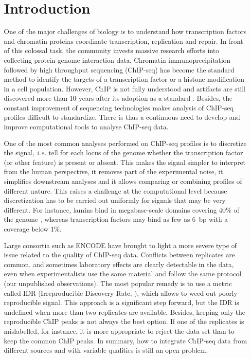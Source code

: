 \documentclass{bioinfo}
\begin{document}
\section{Introduction}
One of the major challenges of biology is to understand how
transcription factors and chromatin proteins coordinate transcription,
replication and repair. In front of this colossal task, the community
invests massive research efforts into collecting protein-genome
interaction data. Chromatin immunoprecipitation followed by high
throughput sequencing (ChIP-seq) has become the standard method to
identify the targets of a transcription factor or a histone
modification in a cell population. However, ChIP is not fully
understood and artifacts are still discovered more than 10 years
after its adoption as a standard \citep{pmid24349523, pmid24173036}.
Besides, the constant improvement of sequencing technologies makes
analysis of ChIP-seq profiles difficult to standardize. There is thus
a continuous need to develop and improve computational tools to
analyse ChIP-seq data.

One of the most common analyses performed on ChIP-seq profiles is to
discretize the signal, \textit{i.e.} tell for each locus of the genome
whether the transcription factor (or other feature) is present or
absent. This makes the signal simpler to interpret from the human
perspective, it removes part of the experimental noise, it simplifies
downstream analyses and it allows comparing or combining profiles of
different nature. This raises a challenge at the computational level
because discretization has to be carried out uniformly for signals
that may be very different. For instance, lamins bind in
megabase-scale domains covering 40\% of the genome
\citep{pmid18463634}, whereas transcription factors may bind as few
as 6~bp with a coverage below 1\%.

Large consortia such as ENCODE have brought to light
a more severe type of issue related to the quality of ChIP-seq data.
Conflicts between replicates are common, and
sometimes laboratory effects are clearly detectable in the data,
even when experimentalists use the same material and follow the same
protocol (our unpublished observations). The most popular remedy is to
use a metric called IDR (Irreproducible Discovery Rate, \citealp{li2011}),
which allows to weed
out poorly reproducible signal. This approach is a significant step
forward, but the IDR is undefined when more than two replicates are
available. Besides, keeping only the reproducible ChIP peaks is not
always the best option. If one of the replicates is mislabelled,
for instance, it is more appropriate to reject the data set than to keep
the common ChIP peaks. In summary, how to integrate ChIP-seq data
from different sources and with variable qualities is still an open
problem.
\end{document}
